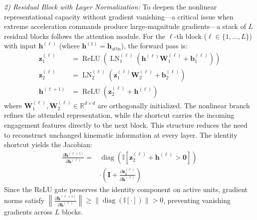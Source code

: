 \documentclass[lettersize,journal]{IEEEtran}
\begin{document}
\emph{2) Residual Block with Layer Normalization:} To deepen the nonlinear representational capacity without gradient vanishing---a critical issue when extreme acceleration commands produce large-magnitude gradients---a stack of $L$ residual blocks follows the attention module. For the $\ell$-th block ($\ell \in \{1, \dots, L\}$) with input $\mathbf{h}^{(\ell)}$ (where $\mathbf{h}^{(1)} = \mathbf{h}_{\mathrm{attn}}$), the forward pass is:
\begin{align}
\mathbf{z}_1^{(\ell)} &= \operatorname{ReLU} \left( \operatorname{LN}_1^{(\ell)} \left( \mathbf{h}^{(\ell)}\mathbf{W}_1^{(\ell)} + \mathbf{b}_1^{(\ell)} \right) \right) \label{eq:res_block_inner1} \\
\mathbf{z}_2^{(\ell)} &= \operatorname{LN}_2^{(\ell)} \left( \mathbf{z}_1^{(\ell)}\mathbf{W}_2^{(\ell)} + \mathbf{b}_2^{(\ell)} \right) \label{eq:res_block_inner2} \\
\mathbf{h}^{(\ell+1)} &= \operatorname{ReLU} \left( \mathbf{z}_2^{(\ell)} + \mathbf{h}^{(\ell)} \right) \label{eq:res_block_out}
\end{align}
where $\mathbf{W}_1^{(\ell)}, \mathbf{W}_2^{(\ell)} \in \mathbb{R}^{d \times d}$ are orthogonally initialized. 
The nonlinear branch refines the attended representation, while
the shortcut carries the incoming engagement features directly to the next
block. This structure reduces the need to reconstruct unchanged kinematic
information at every layer.
The identity shortcut yields the Jacobian:
\begin{equation}
\label{eq:jacobian}
\begin{split}
\frac{\partial \mathbf{h}^{(\ell+1)}}{\partial \mathbf{h}^{(\ell)}} =& \operatorname{diag}\!\left(\mathbb{I}\!\left[\mathbf{z}_2^{(\ell)} + \mathbf{h}^{(\ell)} > \mathbf{0}\right]\right) \\
&\cdot \left(\mathbf{I} + \frac{\partial \mathbf{z}_2^{(\ell)}}{\partial \mathbf{h}^{(\ell)}}\right)
\end{split}
\end{equation}
Since the ReLU gate preserves the identity component on active units, gradient norms satisfy $\left\|\frac{\partial \mathbf{h}^{(\ell+1)}}{\partial \mathbf{h}^{(\ell)}}\right\| \geq \left\|\operatorname{diag}(\mathbb{I}[\cdot])\right\| > 0$, preventing vanishing gradients across $L$ blocks.
\end{document}
